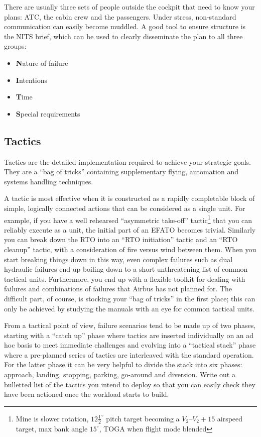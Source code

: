 \documentclass[a5paper,11pt,titlepage]{article}
\begin{document}
There are usually three sets of people outside the cockpit that need to
know your plans: ATC, the cabin crew and the passengers. Under stress,
non-standard communication can easily become muddled. A good tool to
ensure structure is the NITS brief, which can be used to clearly
disseminate the plan to all three groups:

\begin{itemize}
\item \textbf{N}ature of failure
\item \textbf{I}ntentions
\item \textbf{T}ime
\item \textbf{S}pecial requirements
\end{itemize}

\subsection{Tactics}

Tactics are the detailed implementation required to achieve your
strategic goals. They are a ``bag of tricks'' containing supplementary
flying, automation and systems handling techniques.

A tactic is most effective when it is constructed as a rapidly
completable block of simple, logically connected actions that can be
considered as a single unit. For example, if you have a well rehearsed
``asymmetric take-off'' tactic\footnote{Mine is slower rotation,
  $12\frac{1}{2}^\circ$ pitch target becoming a $V_2$--$V_2+15$ airspeed
  target, max bank angle $15^\circ$, TOGA when flight mode blended} that
you can reliably execute as a unit, the initial part of an EFATO becomes
trivial. Similarly you can break down the RTO into an ``RTO initiation''
tactic and an ``RTO cleanup'' tactic, with a consideration of fire
versus wind between them. When you start breaking things down in this
way, even complex failures such as dual hydraulic failures end up
boiling down to a short unthreatening list of common tactical
units. Furthermore, you end up with a flexible toolkit for dealing with
failures and combinations of failures that Airbus has not planned
for. The difficult part, of course, is stocking your ``bag of tricks''
in the first place; this can only be achieved by studying the manuals
with an eye for common tactical units.

From a tactical point of view, failure scenarios tend to be made up of
two phases, starting with a ``catch up'' phase where tactics are
inserted individually on an ad hoc basis to meet immediate challenges
and evolving into a ``tactical stack'' phase where a pre-planned series
of tactics are interleaved with the standard operation. For the latter
phase it can be very helpful to divide the stack into six phases:
approach, landing, stopping, parking, go-around and diversion. Write out
a bulletted list of the tactics you intend to deploy so that you can
easily check they have been actioned once the workload starts to build.
\end{document}
